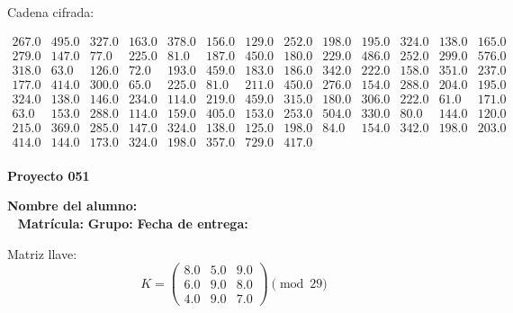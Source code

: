 \documentclass[12pt]{article}
\begin{document}
Cadena cifrada:
\begin{center}
$\begin{array}{lllllllllllll}
267.0 & 495.0 & 327.0 & 163.0 & 378.0 & 156.0 & 129.0 & 252.0 & 198.0 & 195.0 & 324.0 & 138.0 & 165.0\\
279.0 & 147.0 & 77.0 & 225.0 & 81.0 & 187.0 & 450.0 & 180.0 & 229.0 & 486.0 & 252.0 & 299.0 & 576.0\\
318.0 & 63.0 & 126.0 & 72.0 & 193.0 & 459.0 & 183.0 & 186.0 & 342.0 & 222.0 & 158.0 & 351.0 & 237.0\\
177.0 & 414.0 & 300.0 & 65.0 & 225.0 & 81.0 & 211.0 & 450.0 & 276.0 & 154.0 & 288.0 & 204.0 & 195.0\\
324.0 & 138.0 & 146.0 & 234.0 & 114.0 & 219.0 & 459.0 & 315.0 & 180.0 & 306.0 & 222.0 & 61.0 & 171.0\\
63.0 & 153.0 & 288.0 & 114.0 & 159.0 & 405.0 & 153.0 & 253.0 & 504.0 & 330.0 & 80.0 & 144.0 & 120.0\\
215.0 & 369.0 & 285.0 & 147.0 & 324.0 & 138.0 & 125.0 & 198.0 & 84.0 & 154.0 & 342.0 & 198.0 & 203.0\\
414.0 & 144.0 & 173.0 & 324.0 & 198.0 & 357.0 & 729.0 & 417.0\\
\end{array}$
\end{center}

\newpage


\textbf{Proyecto 051}

\textbf{Nombre del alumno:} \underline{\hspace{13cm}}\\\
\vspace{1cm}
\textbf{Matrícula:} \underline{\hspace{4cm}} \hspace{1cm}
\textbf{Grupo:} \underline{\hspace{2cm}}
\textbf{Fecha de entrega:} \underline{\hspace{2cm}}

\medskip

Matriz llave:
\[
K = \begin{pmatrix}
8.0 & 5.0 & 9.0\\
6.0 & 9.0 & 8.0\\
4.0 & 9.0 & 7.0
\end{pmatrix} \pmod{29}
\]
\end{document}
